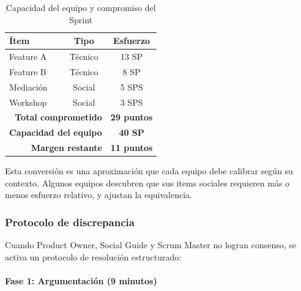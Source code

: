 \begin{table}[h]
    \centering
    \small
    \begin{tabularx}{\textwidth}{|X|c|c|}
        \hline
        \textbf{Ítem}                                       & \textbf{Tipo}      & \textbf{Esfuerzo} \\
        \hline
        Feature A                                           & Técnico            & 13 SP             \\
        \hline
        Feature B                                           & Técnico            & 8 SP              \\
        \hline
        Mediación                                           & Social             & 5 SPS             \\
        \hline
        Workshop                                            & Social             & 3 SPS             \\
        \hline
        \multicolumn{2}{|r|}{\textbf{Total comprometido}}   & \textbf{29 puntos}                     \\
        \hline
        \multicolumn{2}{|r|}{\textbf{Capacidad del equipo}} & \textbf{40 SP}                         \\
        \hline
        \multicolumn{2}{|r|}{\textbf{Margen restante}}      & \textbf{11 puntos}                     \\
        \hline
    \end{tabularx}
    \caption{Capacidad del equipo y compromiso del Sprint}
    \label{tab:capacidad-compromiso-sprint}
\end{table}
\FloatBarrier

Esta conversión es una aproximación que cada equipo debe calibrar según su contexto. Algunos equipos descubren que sus items sociales requieren más o menos esfuerzo relativo, y ajustan la equivalencia.

\subsubsection{Protocolo de discrepancia}

Cuando Product Owner, Social Guide y Scrum Master no logran consenso, se activa un protocolo de resolución estructurado:

\paragraph{Fase 1: Argumentación (9 minutos)}

